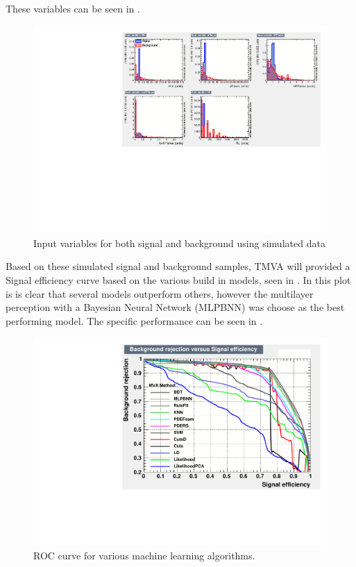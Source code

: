 These variables can be seen in .

\begin{figure}[h!]
\centering

\includegraphics[width=\textwidth]{figures/TMVA/inputvariables.pdf}
\caption{Input variables for both signal and background using simulated data}
\label{fig:TMVAinput}
\end{figure}

Based on these simulated signal and background samples, TMVA will provided a Signal efficiency curve based on the various build in models, seen in . In this plot is is clear that several models outperform others, however the multilayer perception with a Bayesian Neural Network (MLPBNN) was choose as the best performing model. The specific performance can be seen in .


\begin{figure}[h!]
\centering

\includegraphics[width=\textwidth]{figures/TMVA/roc12.pdf}
\caption{ROC curve for various machine learning algorithms.}
\label{fig:TMVAroc}
\end{figure}

